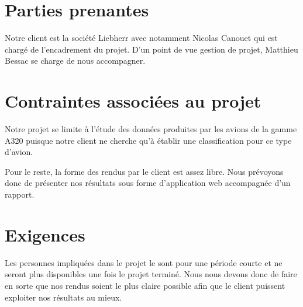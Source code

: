 \section{Parties prenantes}
Notre client est la société Liebherr avec notamment Nicolas Canouet qui est chargé de l'encadrement du projet. D'un point de vue gestion de projet, Matthieu Bessac se charge de nous accompagner.

\section{Contraintes associées au projet}
Notre projet se limite à l'étude des données produites par les avions de la gamme A320 puisque notre client ne cherche qu'à établir une classification pour ce type d'avion.

Pour le reste, la forme des rendus par le client est assez libre. Nous prévoyons donc de présenter nos résultats sous forme d'application web accompagnée d'un rapport.

\section{Exigences}
Les personnes impliquées dans le projet le sont pour une période courte et ne seront plus disponibles une fois le projet terminé. Nous nous devons donc de faire en sorte que nos rendus soient le plus claire possible afin que le client puissent exploiter nos résultats au mieux. 

